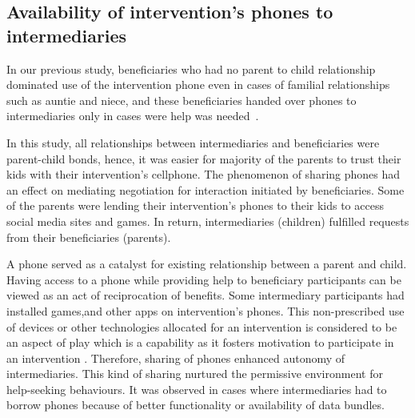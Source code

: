 \documentclass{sig-alternate}
\begin{document}
\subsection*{\textbf{Availability of intervention's phones to intermediaries}}
In our previous study, beneficiaries who had no parent to child relationship dominated  use of the intervention phone even in cases of familial relationships such as auntie and niece, and these beneficiaries handed over phones to intermediaries only in cases were help was needed~\cite{katule2016:leveraging}.

In this study, all relationships between intermediaries and beneficiaries were parent-child bonds, hence, it was easier for majority of the parents to trust their kids with their intervention's cellphone. The phenomenon of sharing phones had an effect on mediating negotiation for interaction initiated by beneficiaries. Some of the parents were lending their intervention's phones to their kids to access social media sites and games. In return, intermediaries (children) fulfilled requests from their beneficiaries (parents).

A phone served as a catalyst for existing relationship between a parent and child. Having access to a phone while providing help to beneficiary participants can be viewed as an act of reciprocation of benefits. Some intermediary participants had installed games,and  other apps on intervention's phones. This non-prescribed use of devices or other technologies allocated for an intervention is considered to be an aspect of play which is a capability as it fosters motivation to participate in an intervention \cite{ferr2015:play}. Therefore, sharing of phones enhanced autonomy of intermediaries. This kind of sharing nurtured the permissive environment for help-seeking behaviours. It was observed in cases where intermediaries had to borrow phones because of better functionality or availability of data bundles.  
\end{document}
